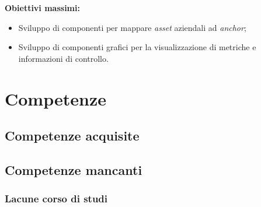 \textbf{Obiettivi massimi:}

\begin{itemize}
  \item Sviluppo di componenti per mappare \textit{asset} aziendali ad \textit{anchor};
  \item Sviluppo di componenti grafici per la visualizzazione di metriche e informazioni di controllo.
\end{itemize}

\section{Competenze}
\subsection{Competenze acquisite}
\subsection{Competenze mancanti}
\subsubsection{Lacune corso di studi}
